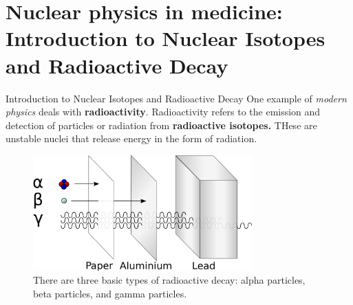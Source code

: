 \documentclass{beamer}
\begin{document}
%

\section{Nuclear physics in medicine: Introduction to Nuclear Isotopes and Radioactive Decay}

\begin{frame}{Introduction to Nuclear Isotopes and Radioactive Decay}
\footnotesize
One example of \textit{modern physics} deals with \textbf{\alert{radioactivity}}.  Radioactivity refers to the emission and detection of particles or radiation from \textbf{radioactive isotopes.}  THese are unstable nuclei that release energy in the form of radiation.
\begin{figure}
\centering
\includegraphics[width=0.75\textwidth]{figures/radioactivity.png}
\caption{\label{fig:radio} There are three basic types of radioactive decay: alpha particles, beta particles, and gamma particles.}
\end{figure}
\end{frame}
\end{document}
